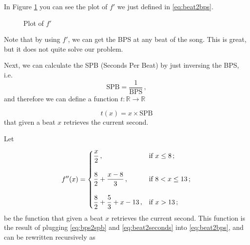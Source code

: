 \documentclass[a4paper,9pt]{article}
\begin{document}
    In Figure \ref{fig:beat2bps} you can see the plot of $f'$ we just defined in \eqref{eq:beat2bps}. 

\begin{figure}[htpb]
	\centering



	\caption{Plot of $f'$}
	\label{fig:beat2bps}
\end{figure}

Note that by using $f'$, we can get the BPS at any beat of the song. This is great, but it does not quite solve our problem. 

Next, we can calculate the SPB (Seconds Per Beat) by just inversing the BPS, i.e.
\begin{equation}
	\text{SPB} = \frac{1}{\text{BPS}}\,,
	\label{eq:bps2spb}
\end{equation}
and therefore we can define a function $t: \mathbb{R} \rightarrow \mathbb{R}$

\begin{equation}
	t(x) = x\times \text{SPB}
	\label{eq:beat2seconds}
\end{equation}
that given a beat $x$ retrieves the current second.

Let 



    \begin{equation}
	    f''(x) = \begin{dcases}
		    \frac{x}{2}\,, & \text{if $x \leq 8\,;$}\\[1em]
		    \frac{8}{2}+\frac{x-8}{3}\,, & \text{if $8 < x \leq 13\,;$}\\[1em]  
		    \frac{8}{2}+\frac{5}{3}+x- 13\,, & \text{if $x > 13\,;$}\\ 
	    \end{dcases}
	    \label{eq:beat2second}
    \end{equation}
    be the function that given a beat $x$ retrieves the current second. This function is the result of plugging \eqref{eq:bps2spb} and \eqref{eq:beat2seconds} into \eqref{eq:beat2bps}, and can be rewritten recursively as
\end{document}
